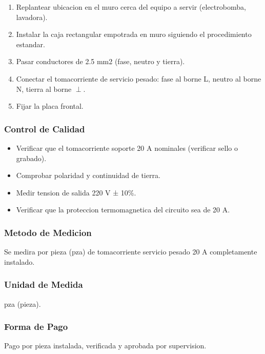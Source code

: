 \begin{enumerate}
  \item Replantear ubicacion en el muro cerca del equipo a servir (electrobomba, lavadora).
  \item Instalar la caja rectangular empotrada en muro siguiendo el procedimiento estandar.
  \item Pasar conductores de 2.5 mm2 (fase, neutro y tierra).
  \item Conectar el tomacorriente de servicio pesado: fase al borne L, neutro al borne N, tierra al borne $\perp$.
  \item Fijar la placa frontal.
\end{enumerate}

\subsubsection{Control de Calidad}

\begin{itemize}
  \item Verificar que el tomacorriente soporte 20 A nominales (verificar sello o grabado).
  \item Comprobar polaridad y continuidad de tierra.
  \item Medir tension de salida 220 V ± 10\%.
  \item Verificar que la proteccion termomagnetica del circuito sea de 20 A.
\end{itemize}

\subsubsection{Metodo de Medicion}

Se medira por pieza (pza) de tomacorriente servicio pesado 20 A completamente instalado.

\subsubsection{Unidad de Medida}

pza (pieza).

\subsubsection{Forma de Pago}

Pago por pieza instalada, verificada y aprobada por supervision.

